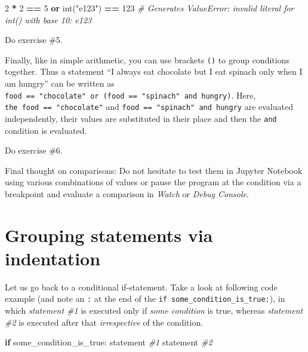 \documentclass[
]{book}
\newenvironment{Shaded}{\begin{snugshade}}{\end{snugshade}}
\newcommand{\BuiltInTok}[1]{#1}
\newcommand{\CommentTok}[1]{\textcolor[rgb]{0.56,0.35,0.01}{\textit{#1}}}
\newcommand{\ControlFlowTok}[1]{\textcolor[rgb]{0.13,0.29,0.53}{\textbf{#1}}}
\newcommand{\DecValTok}[1]{\textcolor[rgb]{0.00,0.00,0.81}{#1}}
\newcommand{\KeywordTok}[1]{\textcolor[rgb]{0.13,0.29,0.53}{\textbf{#1}}}
\newcommand{\NormalTok}[1]{#1}
\newcommand{\OperatorTok}[1]{\textcolor[rgb]{0.81,0.36,0.00}{\textbf{#1}}}
\newcommand{\StringTok}[1]{\textcolor[rgb]{0.31,0.60,0.02}{#1}}
\begin{document}
\begin{Shaded}
\begin{Highlighting}[]
\DecValTok{2} \OperatorTok{*} \DecValTok{2} \OperatorTok{==} \DecValTok{5} \KeywordTok{or} \BuiltInTok{int}\NormalTok{(}\StringTok{"e123"}\NormalTok{) }\OperatorTok{==} \DecValTok{123}
\CommentTok{\# Generates ValueError: invalid literal for int() with base 10: \textquotesingle{}e123\textquotesingle{}}
\end{Highlighting}
\end{Shaded}

Do exercise \#5.

Finally, like in simple arithmetic, you can use brackets \texttt{()} to group conditions together. Thus a statement ``I always eat chocolate but I eat spinach only when I am hungry'' can be written as \texttt{food\ ==\ "chocolate"\ or\ (food\ ==\ "spinach"\ and\ hungry)}. Here, \texttt{the\ food\ ==\ "chocolate"} and \texttt{food\ ==\ "spinach"\ and\ hungry} are evaluated independently, their values are substituted in their place and then the \texttt{and} condition is evaluated.

Do exercise \#6.

Final thought on comparisons: Do not hesitate to test them in Jupyter Notebook using various combinations of values or pause the program at the condition via a breakpoint and evaluate a comparison in \emph{Watch} or \emph{Debug Console}.

\hypertarget{indentation}{%
\section{Grouping statements via indentation}\label{indentation}}

Let us go back to a conditional if-statement. Take a look at following code example (and note an \texttt{:} at the end of the \texttt{if\ some\_condition\_is\_true:}), in which \emph{statement \#1} is executed only if \emph{some condition} is true, whereas \emph{statement \#2} is executed after that \emph{irrespective} of the condition.

\begin{Shaded}
\begin{Highlighting}[]
\ControlFlowTok{if}\NormalTok{ some\_condition\_is\_true:}
\NormalTok{    statement }\CommentTok{\#1}
\NormalTok{statement }\CommentTok{\#2 }
\end{Highlighting}
\end{Shaded}
\end{document}
